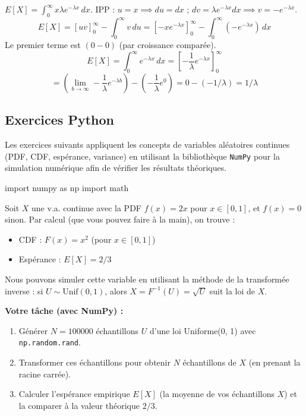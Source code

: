 \begin{correctionbox}
$E[X] = \int_0^\infty x \lambda e^{-\lambda x} \, dx$.
IPP : $u=x \implies du=dx$ ; $dv=\lambda e^{-\lambda x}dx \implies v=-e^{-\lambda x}$.
$$E[X] = [u v]_0^\infty - \int_0^\infty v \, du = \left[ -x e^{-\lambda x} \right]_0^\infty - \int_0^\infty (-e^{-\lambda x}) \, dx$$
Le premier terme est $(0 - 0)$ (par croissance comparée).
$$E[X] = \int_0^\infty e^{-\lambda x} \, dx = \left[ -\frac{1}{\lambda} e^{-\lambda x} \right]_0^\infty$$
$$= \left( \lim_{b \to \infty} -\frac{1}{\lambda} e^{-\lambda b} \right) - \left( -\frac{1}{\lambda} e^0 \right) = 0 - (-1/\lambda) = 1/\lambda$$
\end{correctionbox}

\subsection{Exercices Python}

Les exercices suivants appliquent les concepts de variables aléatoires continues (PDF, CDF, espérance, variance) en utilisant la bibliothèque \texttt{NumPy} pour la simulation numérique afin de vérifier les résultats théoriques.

\begin{codecell}
import numpy as np
import math
\end{codecell}

\begin{exercicebox}
Soit $X$ une v.a. continue avec la PDF $f(x) = 2x$ pour $x \in [0, 1]$, et $f(x)=0$ sinon.
Par calcul (que vous pouvez faire à la main), on trouve :
\begin{itemize}
    \item CDF : $F(x) = x^2$ (pour $x \in [0, 1]$)
    \item Espérance : $E[X] = 2/3$
\end{itemize}
Nous pouvons simuler cette variable en utilisant la méthode de la transformée inverse : si $U \sim \text{Unif}(0, 1)$, alors $X = F^{-1}(U) = \sqrt{U}$ suit la loi de $X$.

\textbf{Votre tâche (avec NumPy) :}
\begin{enumerate}
    \item Générer $N=100000$ échantillons $U$ d'une loi Uniforme(0, 1) avec \texttt{np.random.rand}.
    \item Transformer ces échantillons pour obtenir $N$ échantillons de $X$ (en prenant la racine carrée).
    \item Calculer l'espérance empirique $E[X]$ (la moyenne de vos échantillons $X$) et la comparer à la valeur théorique $2/3$.
\end{enumerate}
\end{exercicebox}

